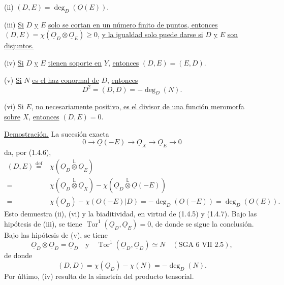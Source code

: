 \pageoriginale

\noindent (ii) \quad $(D,E)=\deg_D(\underline O(E))$.

\noindent (iii) \quad \underline{Si} $D$ \underline{y} $E$
\underline{solo se cortan en un número finito de puntos, entonces}
$(D,E)=\chi(\underline{O}_D\otimes\underline{O}_E)\geq0$,
\underline{y la igualdad solo puede darse si} $D$ \underline{y} $E$
\underline{son disjuntos.}

\noindent (iv) \quad \underline{Si} $D$ \underline{y} $E$
\underline{tienen soporte en} $Y$, \underline{entonces} $(D,E)=(E,D)$.

\noindent (v) \quad \underline{Si} $N$ \underline{es el haz conormal de}
$D$, \underline{entonces}
\begin{equation*}
D^2=(D,D)=-\deg_D(N).
\end{equation*}

\noindent (vi) \quad \underline{Si} $E$, \underline{no necesariamente
positivo, es el divisor de una función meromorfa sobre} $X$,
\underline{entonces} $(D,E)=0$.

\medskip
\noindent\underline{Demostración.}
La sucesión exacta
\begin{equation*}
0\longrightarrow\underline O(-E)\longrightarrow\underline O_X
\longrightarrow\underline O_E\longrightarrow0
\end{equation*}
da, por (1.4.6),
\begin{equation*}
\begin{array}{rl}
(D,E)\overset{\mathrm{def}}{=}&
\chi(\underline{O}_D\overset{\mathbb L}{\otimes}\underline{O}_E)\\
=&\chi(\underline{O}_D\overset{\mathbb L}{\otimes}\underline{O}_X)
-\chi(\underline{O}_D\overset{\mathbb L}{\otimes}\underline O(-E))\\[1ex]
=&\chi(\underline{O}_D)-\chi(\underline O(-E)|D)
=-\deg_D(\underline O(-E))=\deg_D(\underline O(E)).
\end{array}
\end{equation*}
Esto demuestra (ii), (vi) y la biaditividad, en virtud de (1.4.5) y (1.4.7).
Bajo las hipótesis de (iii), se tiene
$\operatorname{Tor}^1(\underline{O}_D,\underline{O}_E)=0$, de donde se sigue
la conclusión. Bajo las hipótesis de (v), se tiene
\begin{equation*}
\underline{O}_D\otimes\underline{O}_D=\underline{O}_D
\quad\text{y}\quad
\operatorname{Tor}^1(\underline{O}_D,\underline{O}_D)\simeq N
\quad(\text{SGA 6 VII 2.5}),
\end{equation*}
de donde
\begin{equation*}
(D,D)=\chi(\underline{O}_D)-\chi(N)=-\deg_D(N).
\end{equation*}
Por último, (iv) resulta de la simetría del producto tensorial.


